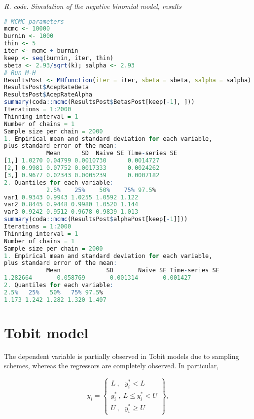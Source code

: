\begin{tcolorbox}[enhanced,width=4.67in,center upper,
	fontupper=\large\bfseries,drop shadow southwest,sharp corners]
	\textit{R. code. Simulation of the negative binomial model, results}
	\begin{VF}
		\begin{lstlisting}[language=R]
# MCMC parameters
mcmc <- 10000
burnin <- 1000
thin <- 5
iter <- mcmc + burnin
keep <- seq(burnin, iter, thin)
sbeta <- 2.93/sqrt(k); salpha <- 2.93
# Run M-H
ResultsPost <- MHfunction(iter = iter, sbeta = sbeta, salpha = salpha)
ResultsPost$AcepRateBeta
ResultsPost$AcepRateAlpha
summary(coda::mcmc(ResultsPost$BetasPost[keep[-1], ]))
Iterations = 1:2000
Thinning interval = 1 
Number of chains = 1 
Sample size per chain = 2000 
1. Empirical mean and standard deviation for each variable,
plus standard error of the mean:
			Mean      SD  Naive SE Time-series SE
[1,] 1.0270 0.04799 0.0010730      0.0014727
[2,] 0.9981 0.07752 0.0017333      0.0024262
[3,] 0.9677 0.02343 0.0005239      0.0007182
2. Quantiles for each variable:
			2.5%    25%    50%    75% 97.5%
var1 0.9343 0.9943 1.0255 1.0592 1.122
var2 0.8445 0.9448 0.9980 1.0520 1.144
var3 0.9242 0.9512 0.9678 0.9839 1.013
summary(coda::mcmc(ResultsPost$alphaPost[keep[-1]]))
Iterations = 1:2000
Thinning interval = 1 
Number of chains = 1 
Sample size per chain = 2000 
1. Empirical mean and standard deviation for each variable,
plus standard error of the mean:
			Mean             SD       Naive SE Time-series SE 
1.282664       0.058769       0.001314       0.001427 
2. Quantiles for each variable:
2.5%   25%   50%   75% 97.5% 
1.173 1.242 1.282 1.320 1.407
\end{lstlisting}
	\end{VF}
\end{tcolorbox} 

\section{Tobit model}\label{sec68}
The dependent variable is partially observed in Tobit models due to sampling schemes, whereas the regressors are completely observed. In particular,

\begin{equation*}
	y_i=\begin{Bmatrix}
		L \ , \ \ \ y_i^*<L\\
		y_i^* \ , \ L\leq y_i^* < U \\ 
		U \ , \ \ \ y_i^*\geq U
	\end{Bmatrix},
\end{equation*}


